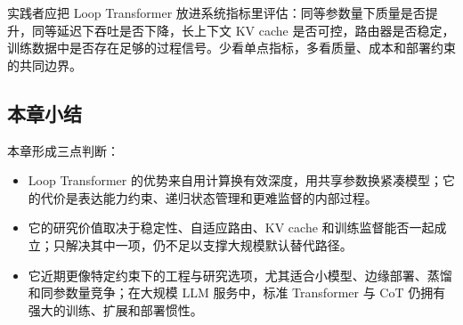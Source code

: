 实践者应把 Loop Transformer 放进系统指标里评估：同等参数量下质量是否提升，同等延迟下吞吐是否下降，长上下文 KV cache 是否可控，路由器是否稳定，训练数据中是否存在足够的过程信号。少看单点指标，多看质量、成本和部署约束的共同边界。

\subsection{本章小结}

本章形成三点判断：

\begin{itemize}
  \item Loop Transformer 的优势来自用计算换有效深度，用共享参数换紧凑模型；它的代价是表达能力约束、递归状态管理和更难监督的内部过程。
  \item 它的研究价值取决于稳定性、自适应路由、KV cache 和训练监督能否一起成立；只解决其中一项，仍不足以支撑大规模默认替代路径。
  \item 它近期更像特定约束下的工程与研究选项，尤其适合小模型、边缘部署、蒸馏和同参数量竞争；在大规模 LLM 服务中，标准 Transformer 与 CoT 仍拥有强大的训练、扩展和部署惯性。
\end{itemize}
